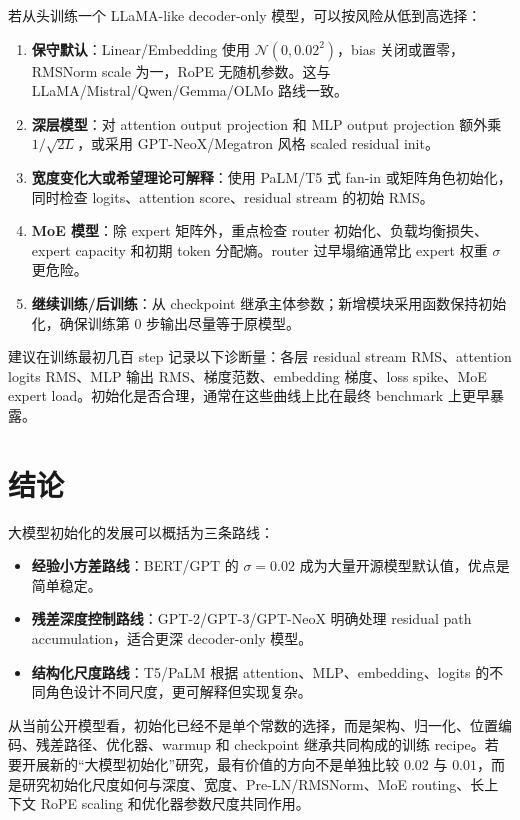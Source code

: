 \documentclass[UTF8,a4paper,11pt]{ctexart}
\newcommand{\Normal}{\mathcal{N}}
\begin{document}
若从头训练一个 LLaMA-like decoder-only 模型，可以按风险从低到高选择：

\begin{enumerate}
  \item \textbf{保守默认}：Linear/Embedding 使用 $\Normal(0,0.02^2)$，bias 关闭或置零，RMSNorm scale 为一，RoPE 无随机参数。这与 LLaMA/Mistral/Qwen/Gemma/OLMo 路线一致。
  \item \textbf{深层模型}：对 attention output projection 和 MLP output projection 额外乘 $1/\sqrt{2L}$，或采用 GPT-NeoX/Megatron 风格 scaled residual init。
  \item \textbf{宽度变化大或希望理论可解释}：使用 PaLM/T5 式 fan-in 或矩阵角色初始化，同时检查 logits、attention score、residual stream 的初始 RMS。
  \item \textbf{MoE 模型}：除 expert 矩阵外，重点检查 router 初始化、负载均衡损失、expert capacity 和初期 token 分配熵。router 过早塌缩通常比 expert 权重 $\sigma$ 更危险。
  \item \textbf{继续训练/后训练}：从 checkpoint 继承主体参数；新增模块采用函数保持初始化，确保训练第 0 步输出尽量等于原模型。
\end{enumerate}

建议在训练最初几百 step 记录以下诊断量：各层 residual stream RMS、attention logits RMS、MLP 输出 RMS、梯度范数、embedding 梯度、loss spike、MoE expert load。初始化是否合理，通常在这些曲线上比在最终 benchmark 上更早暴露。

\section{结论}

大模型初始化的发展可以概括为三条路线：

\begin{itemize}
  \item \textbf{经验小方差路线}：BERT/GPT 的 $\sigma=0.02$ 成为大量开源模型默认值，优点是简单稳定。
  \item \textbf{残差深度控制路线}：GPT-2/GPT-3/GPT-NeoX 明确处理 residual path accumulation，适合更深 decoder-only 模型。
  \item \textbf{结构化尺度路线}：T5/PaLM 根据 attention、MLP、embedding、logits 的不同角色设计不同尺度，更可解释但实现复杂。
\end{itemize}

从当前公开模型看，初始化已经不是单个常数的选择，而是架构、归一化、位置编码、残差路径、优化器、warmup 和 checkpoint 继承共同构成的训练 recipe。若要开展新的“大模型初始化”研究，最有价值的方向不是单独比较 $0.02$ 与 $0.01$，而是研究初始化尺度如何与深度、宽度、Pre-LN/RMSNorm、MoE routing、长上下文 RoPE scaling 和优化器参数尺度共同作用。
\end{document}
